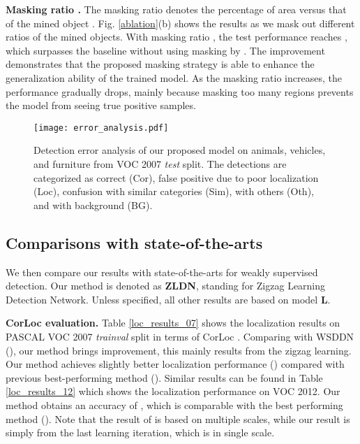\documentclass[10pt,twocolumn,letterpaper]{article}
\begin{document}
\noindent  \textbf{Masking ratio .} The masking ratio  denotes the percentage of area  versus that of the mined object . Fig. \ref{ablation}(b) shows the results as we mask out different ratios of the mined objects. With masking ratio , the test performance reaches , which surpasses the baseline without using masking by . The improvement demonstrates that the proposed masking strategy is able to enhance the generalization ability of the trained model. As the masking ratio increases, the performance gradually drops, mainly because masking too many regions prevents the model from seeing true positive samples.

\begin{figure}[!t]
  \centering
\texttt{[image: error\_analysis.pdf]} \\
  \vspace{0.1cm}
  \caption{Detection error analysis \cite{hoiem2012diagnosing} of our proposed model on animals, vehicles, and furniture from VOC 2007 \emph{test} split. The detections are categorized as correct (Cor), false positive due to poor localization (Loc), confusion with similar categories (Sim), with others (Oth), and with background (BG).} \label{error_analysis}
\vspace{-0.1cm}
\end{figure}

\subsection{Comparisons with state-of-the-arts} We then compare our results with state-of-the-arts for weakly supervised detection. Our method is denoted as \textbf{ZLDN}, standing for Zigzag Learning Detection Network. Unless specified, all other results are based on model \textbf{L}.

\noindent  \textbf{CorLoc evaluation.} Table \ref{loc_results_07} shows the localization results on PASCAL VOC 2007 \emph{trainval} split in terms of CorLoc \cite{deselaers2012weakly}. Comparing with WSDDN \cite{bency2016weakly} (), our method brings  improvement, this mainly results from the zigzag learning. Our method achieves slightly better localization performance () compared with previous best-performing method \cite{Tang_2017_CVPR} (). Similar results can be found in Table \ref{loc_results_12} which shows the localization performance on VOC 2012. Our method obtains an accuracy of , which is comparable with the best performing method \cite{Tang_2017_CVPR} (). Note that the result of \cite{Tang_2017_CVPR} is based on multiple scales, while our result is simply from the last learning iteration, which is in single scale.
\end{document}

